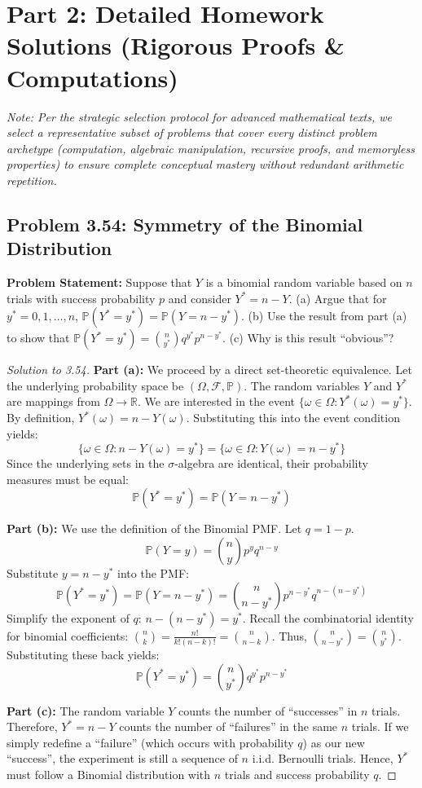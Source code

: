 \documentclass[11pt, letterpaper]{article}
\theoremstyle{definition}
\theoremstyle{remark}
\newcommand{\Prob}{\mathbb{P}}
\newcommand{\R}{\mathbb{R}}
\newcommand{\F}{\mathcal{F}}
\begin{document}
\newpage

\section{Part 2: Detailed Homework Solutions (Rigorous Proofs \& Computations)}

\textit{Note: Per the strategic selection protocol for advanced mathematical texts, we select a representative subset of problems that cover every distinct problem archetype (computation, algebraic manipulation, recursive proofs, and memoryless properties) to ensure complete conceptual mastery without redundant arithmetic repetition.}

\subsection{Problem 3.54: Symmetry of the Binomial Distribution}
\textbf{Problem Statement:} Suppose that $Y$ is a binomial random variable based on $n$ trials with success probability $p$ and consider $Y^* = n - Y$.
(a) Argue that for $y^* = 0, 1, \dots, n$, $\Prob(Y^* = y^*) = \Prob(Y = n - y^*)$.
(b) Use the result from part (a) to show that $\Prob(Y^* = y^*) = \binom{n}{y^*} q^{y^*} p^{n-y^*}$.
(c) Why is this result ``obvious''?

\begin{proof}[Solution to 3.54]
\textbf{Part (a):} We proceed by a direct set-theoretic equivalence. Let the underlying probability space be $(\Omega, \F, \Prob)$. The random variables $Y$ and $Y^*$ are mappings from $\Omega \to \R$. 
We are interested in the event $\{\omega \in \Omega : Y^*(\omega) = y^*\}$. 
By definition, $Y^*(\omega) = n - Y(\omega)$. Substituting this into the event condition yields:
\[ \{\omega \in \Omega : n - Y(\omega) = y^*\} = \{\omega \in \Omega : Y(\omega) = n - y^*\} \]
Since the underlying sets in the $\sigma$-algebra are identical, their probability measures must be equal:
\[ \Prob(Y^* = y^*) = \Prob(Y = n - y^*) \]

\textbf{Part (b):} We use the definition of the Binomial PMF. Let $q = 1-p$.
\[ \Prob(Y = y) = \binom{n}{y} p^y q^{n-y} \]
Substitute $y = n - y^*$ into the PMF:
\[ \Prob(Y^* = y^*) = \Prob(Y = n - y^*) = \binom{n}{n - y^*} p^{n - y^*} q^{n - (n - y^*)} \]
Simplify the exponent of $q$: $n - (n - y^*) = y^*$. 
Recall the combinatorial identity for binomial coefficients: $\binom{n}{k} = \frac{n!}{k!(n-k)!} = \binom{n}{n-k}$. Thus, $\binom{n}{n-y^*} = \binom{n}{y^*}$.
Substituting these back yields:
\[ \Prob(Y^* = y^*) = \binom{n}{y^*} q^{y^*} p^{n-y^*} \]

\textbf{Part (c):} The random variable $Y$ counts the number of ``successes'' in $n$ trials. Therefore, $Y^* = n - Y$ counts the number of ``failures'' in the same $n$ trials. If we simply redefine a ``failure'' (which occurs with probability $q$) as our new ``success'', the experiment is still a sequence of $n$ i.i.d. Bernoulli trials. Hence, $Y^*$ must follow a Binomial distribution with $n$ trials and success probability $q$.
\end{proof}
\end{document}
